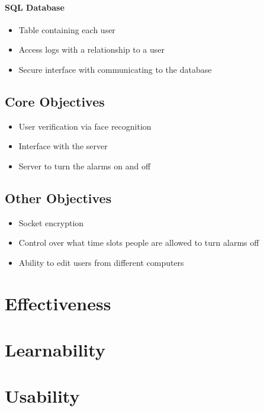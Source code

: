 \documentclass[a4paper]{article}
\begin{document}
		\paragraph{SQL Database}
		
			\begin{itemize}
				\item Table containing each user
				\item Access logs with a relationship to a user
				\item Secure interface with communicating to the database
			\end{itemize}

	\subsection{Core Objectives}
		
		\begin{itemize}
			\item User verification via face recognition
			\item Interface with the server
			\item Server to turn the alarms on and off
		\end{itemize}

	\subsection{Other Objectives}
		
		\begin{itemize}
			\item Socket encryption
			\item Control over what time slots people are allowed to turn alarms off
			\item Ability to edit users from different computers
		\end{itemize}

\section{Effectiveness}

\section{Learnability}

\section{Usability}
\end{document}
